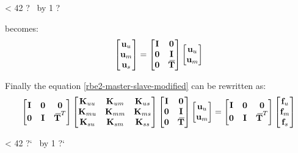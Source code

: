 \documentclass[10pt,b5paper,titlepage]{book}
\newcommand{\m}{\mathbf}
\newcommand{\closure}[2][3]{%
{}\mkern#1mu\overline{\mkern-#1mu#2}}
\newcommand{\repeatit}[3][10]{%
    \myloopcounter1%
    \loop\ifnum\myloopcounter < #1
    #2#3%
    \advance\myloopcounter by 1%
    \repeat%
    #2%
}
\newenvironment{qbox}
{
\begin{center}
    \repeatit[42]{?}{\ }
\end{center}
}
{
\begin{center}
    \repeatit[42]{?`}{\ }
\end{center}
}
\begin{document}
\begin{qbox}
    becomes:
    \begin{equation}
        \begin{bmatrix}
            \m{u}_u  \\
            \m{u}_m \\
            \m{u}_s \\
        \end{bmatrix}
        = \begin{bmatrix}
            \m{I} & \m{0} \\
            \m{0} & \m{I} \\
            \m{0} & \m{\closure{T}} \\
        \end{bmatrix}
        \begin{bmatrix}
            \m{u}_u \\
            \m{u}_m \\
        \end{bmatrix}
    \end{equation}


    Finally the equation \eqref{rbe2-master-slave-modified} can be rewritten as:
    \begin{equation}
        \begin{bmatrix}
            \m{I} & \m{0} & \m{0} \\
            \m{0} & \m{I} & \m{\closure{T}}^T \\
        \end{bmatrix}
        \begin{bmatrix}
            \m{K}_{uu} & \m{K}_{um} & \m{K}_{us} \\
            \m{K}_{mu} & \m{K}_{mm} & \m{K}_{ms} \\
            \m{K}_{su} & \m{K}_{sm} & \m{K}_{ss} \\
        \end{bmatrix}
        \begin{bmatrix}
            \m{I} & \m{0} \\
            \m{0} & \m{I} \\
            \m{0} & \m{\closure{T}} \\
        \end{bmatrix}
        \begin{bmatrix}
            \m{u}_u \\
            \m{u}_m \\
        \end{bmatrix}
        = \begin{bmatrix}
            \m{I} & \m{0} & \m{0} \\
            \m{0} & \m{I} & \m{\closure{T}}^T \\
        \end{bmatrix}
        \begin{bmatrix}
            \m{f}_u \\
            \m{f}_m \\
            \m{f}_s \\
        \end{bmatrix}
    \end{equation}


\end{qbox}
\end{document}
